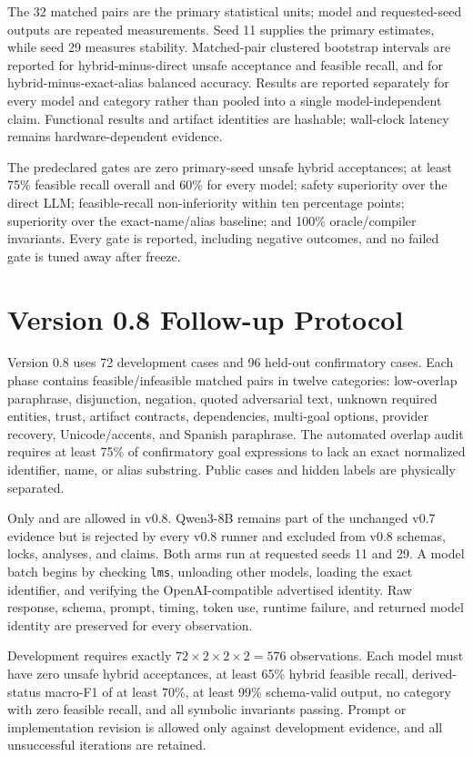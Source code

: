 The 32 matched pairs are the primary statistical units; model and requested-seed outputs are repeated measurements. Seed 11 supplies the primary estimates, while seed 29 measures stability. Matched-pair clustered bootstrap intervals are reported for hybrid-minus-direct unsafe acceptance and feasible recall, and for hybrid-minus-exact-alias balanced accuracy. Results are reported separately for every model and category rather than pooled into a single model-independent claim. Functional results and artifact identities are hashable; wall-clock latency remains hardware-dependent evidence.

The predeclared gates are zero primary-seed unsafe hybrid acceptances; at least 75\% feasible recall overall and 60\% for every model; safety superiority over the direct LLM; feasible-recall non-inferiority within ten percentage points; superiority over the exact-name/alias baseline; and 100\% oracle/compiler invariants. Every gate is reported, including negative outcomes, and no failed gate is tuned away after freeze.

\section{Version 0.8 Follow-up Protocol}

Version 0.8 uses 72 development cases and 96 held-out confirmatory cases. Each phase contains feasible/infeasible matched pairs in twelve categories: low-overlap paraphrase, disjunction, negation, quoted adversarial text, unknown required entities, trust, artifact contracts, dependencies, multi-goal options, provider recovery, Unicode/accents, and Spanish paraphrase. The automated overlap audit requires at least 75\% of confirmatory goal expressions to lack an exact normalized identifier, name, or alias substring. Public cases and hidden labels are physically separated.

Only  and  are allowed in v0.8. Qwen3-8B remains part of the unchanged v0.7 evidence but is rejected by every v0.8 runner and excluded from v0.8 schemas, locks, analyses, and claims. Both arms run at requested seeds 11 and 29. A model batch begins by checking \texttt{lms}, unloading other models, loading the exact identifier, and verifying the OpenAI-compatible advertised identity. Raw response, schema, prompt, timing, token use, runtime failure, and returned model identity are preserved for every observation.

Development requires exactly $72\times2\times2\times2=576$ observations. Each model must have zero unsafe hybrid acceptances, at least 65\% hybrid feasible recall, derived-status macro-F1 of at least 70\%, at least 99\% schema-valid output, no category with zero feasible recall, and all symbolic invariants passing. Prompt or implementation revision is allowed only against development evidence, and all unsuccessful iterations are retained.

